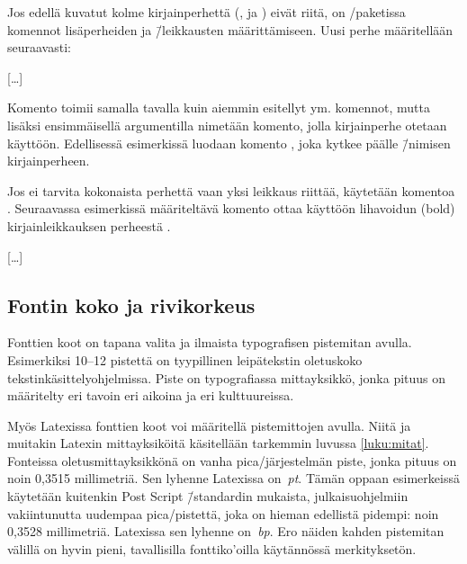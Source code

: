 Jos edellä kuvatut kolme kirjainperhettä (,
 ja ) eivät
riitä, on \-/paketissa komennot lisäperheiden ja
\=/leikkausten määrittämiseen. Uusi perhe määritellään seu\-raa\-vasti:

\begin{koodilohkosis}
  […]
\end{koodilohkosis}

Komento  toimii samalla tavalla kuin
aiemmin esitellyt  ym. komennot, mutta
lisäksi ensimmäisellä argumentilla nimetään komento, jolla kirjainperhe
otetaan käyttöön. Edellisessä esimerkissä luodaan komento , joka kytkee päälle 
\=/nimisen kirjainperheen.

Jos ei tarvita kokonaista perhettä vaan yksi leikkaus riittää, käytetään
komentoa . Seuraavassa esimerkissä
määriteltävä komento  ottaa käyttöön
lihavoidun (bold) kirjainleikkauksen perheestä .

\begin{koodilohkosis}
  […]
\end{koodilohkosis}

\subsection{Fontin koko ja rivikorkeus}

Fonttien koot on tapana valita ja ilmaista typografisen pistemitan
avulla. Esimerkiksi 10--12 pistettä on tyypillinen leipätekstin
oletuskoko teks\-tin\-kä\-sit\-tely\-ohjel\-mis\-sa. Piste on
typografiassa mitta\-yksikkö, jonka pituus on määritelty eri tavoin eri
aikoina ja eri kulttuureissa.

Myös Latexissa fonttien koot voi määritellä pistemittojen avulla. Niitä
ja muitakin Latexin mit\-ta\-yk\-si\-köi\-tä käsitellään tarkemmin
luvussa \ref{luku:mitat}. Fonteissa ole\-tus\-mitta\-yk\-sik\-kö\-nä on
vanha pica\-/järjestelmän piste, jonka pituus on noin 0,3515
millimetriä. Sen lyhenne Latexissa on~\emph{pt}. Tämän oppaan
esimerkeissä käytetään kuitenkin Post Script \=/standardin mukaista,
julkaisuohjelmiin vakiintunutta uudempaa pica\-/pistettä, joka on hieman
edellistä pidempi: noin 0,3528 millimetriä. Latexissa sen lyhenne
on~\emph{bp}. Ero näiden kahden pistemitan välillä on hyvin pieni,
tavallisilla fonttiko'oilla käytännössä merkityksetön.

